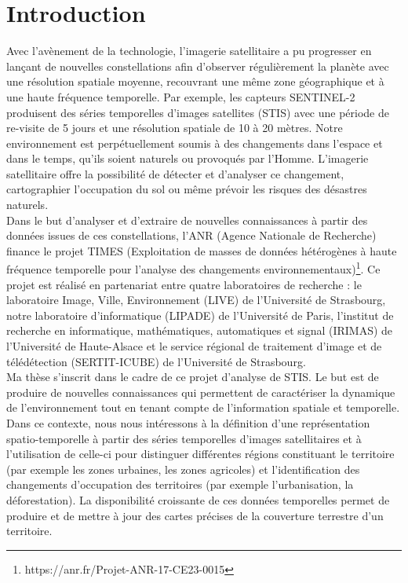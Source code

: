 \chapter*{Introduction}

Avec l’avènement de la technologie, l'imagerie satellitaire a pu progresser en lançant de nouvelles constellations afin d'observer régulièrement la planète avec une résolution spatiale moyenne, recouvrant une même zone géographique et à une haute fréquence temporelle. Par exemple, les capteurs SENTINEL-2 produisent des séries temporelles d’images satellites (STIS) avec une période de re-visite de 5 jours et une résolution spatiale de 10 à 20 mètres. 
Notre environnement est perpétuellement soumis à des changements dans l’espace et dans le temps, qu'ils soient naturels ou provoqués par l'Homme. L'imagerie satellitaire offre la possibilité de détecter et d'analyser ce changement, cartographier l'occupation du sol ou même prévoir les risques des désastres naturels.\\

Dans le but d'analyser et d'extraire de nouvelles connaissances à partir des données issues de ces constellations, l'ANR (Agence Nationale de Recherche) finance le projet TIMES (Exploitation de masses de données hétérogènes à haute fréquence temporelle pour l’analyse des changements environnementaux)\footnote{https://anr.fr/Projet-ANR-17-CE23-0015}. Ce projet est réalisé en partenariat entre quatre laboratoires de recherche : le laboratoire Image,
Ville, Environnement (LIVE) de l'Université de Strasbourg, notre laboratoire d'informatique (LIPADE) de l'Université de Paris, l'institut de recherche en informatique, mathématiques, automatiques et signal (IRIMAS) de l'Université de Haute-Alsace et le service régional de traitement d'image et de télédétection (SERTIT-ICUBE) de l'Université de Strasbourg.\\

Ma thèse s'inscrit dans le cadre de ce projet d'analyse de STIS. Le but est de produire de nouvelles connaissances qui permettent de caractériser la dynamique de l'environnement tout en tenant compte de l'information spatiale et temporelle. 
Dans ce contexte, nous nous intéressons à la définition d'une représentation spatio-temporelle à partir des séries temporelles d'images satellitaires et à l'utilisation de celle-ci pour distinguer différentes régions constituant le territoire (par exemple les zones urbaines, les zones agricoles) et l'identification des changements d'occupation des territoires (par exemple l'urbanisation, la déforestation). 
La disponibilité croissante de ces données temporelles permet de produire et de mettre à jour des cartes précises de la couverture terrestre d'un territoire.



